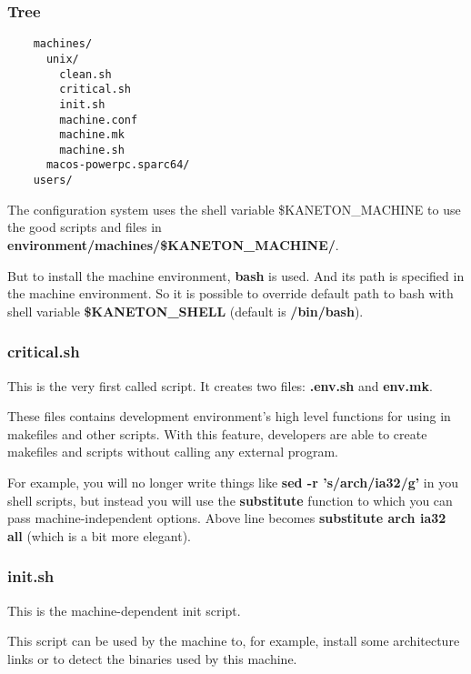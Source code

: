 \begin{frame}[containsverbatim]
  \frametitle{Tree}

  \begin{verbatim}
    machines/
      unix/
        clean.sh
        critical.sh
        init.sh
        machine.conf
        machine.mk
        machine.sh
      macos-powerpc.sparc64/
    users/
  \end{verbatim}

  The configuration system uses the shell variable \$KANETON\_MACHINE to
  use the good scripts and files in \textbf{environment/machines/\$KANETON\_MACHINE/}.

  \nl

  But to install the machine environment, \textbf{bash} is used. And its
  path is specified in the machine environment. So it is possible to override
  default path to bash with shell variable \textbf{\$KANETON\_SHELL} (default
  is \textbf{/bin/bash}).
\end{frame}


\begin{frame}
  \frametitle{critical.sh}

  This is the very first called script. It creates two files: \textbf{.env.sh}
  and \textbf{env.mk}.

  \nl

  These files contains development environment's high level functions for using
  in makefiles and other scripts. With this feature, developers are able to
  create makefiles and scripts without calling any external program.

  \nl

  For example, you will no longer write things like
  \textbf{sed -r 's/arch/ia32/g'} in you shell scripts, but instead you will
  use the \textbf{substitute} function to which you can pass
  machine-independent options. Above line becomes
  \textbf{substitute arch ia32 all} (which is a bit more elegant).
\end{frame}


\begin{frame}
  \frametitle{init.sh}

  This is the machine-dependent init script.

  \nl

  This script can be used by the machine to, for example, install some
  architecture links or to detect the binaries used by this machine.
\end{frame}

